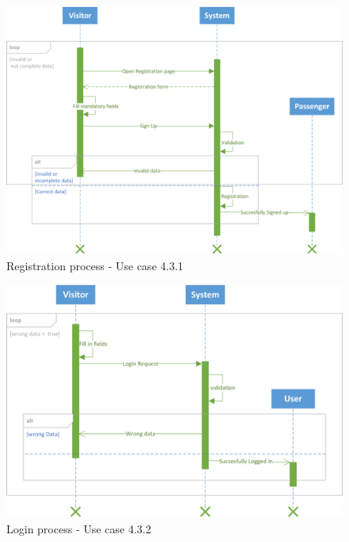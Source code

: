 \documentclass{article}
\begin{document}
     \begin{figure}[h!]
        \centering
        \includegraphics[width=1\columnwidth]{sequenceDiagram/registration}
        \caption{Registration process - Use case 4.3.1}
        \label{fig:seq-reg}
    \end{figure}
    
    \begin{figure}[h!]
        \centering
        \includegraphics[width=1\columnwidth]{sequenceDiagram/Login}
        \caption{Login process - Use case 4.3.2}
        \label{fig:seq-login}
    \end{figure}
\end{document}
